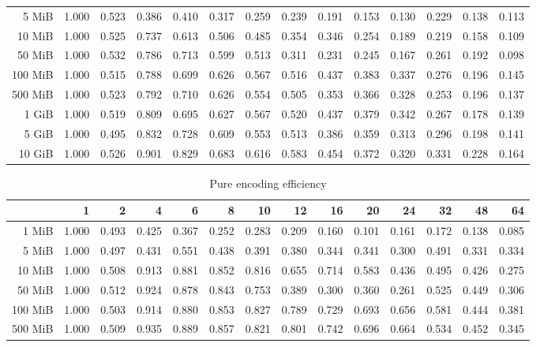 \begin{centering}
\begin{table}[!h]
\begin{tabular}{rrrrrrrrrrrrrr}
		5 MiB   & 1.000 & 0.523 & 0.386 & 0.410 & 0.317 & 0.259 & 0.239 & 0.191 & 0.153 & 0.130 & 0.229 & 0.138 & 0.113 \\
		10 MiB  & 1.000 & 0.525 & 0.737 & 0.613 & 0.506 & 0.485 & 0.354 & 0.346 & 0.254 & 0.189 & 0.219 & 0.158 & 0.109 \\
		50 MiB  & 1.000 & 0.532 & 0.786 & 0.713 & 0.599 & 0.513 & 0.311 & 0.231 & 0.245 & 0.167 & 0.261 & 0.192 & 0.098 \\
		100 MiB & 1.000 & 0.515 & 0.788 & 0.699 & 0.626 & 0.567 & 0.516 & 0.437 & 0.383 & 0.337 & 0.276 & 0.196 & 0.145 \\
		500 MiB & 1.000 & 0.523 & 0.792 & 0.710 & 0.626 & 0.554 & 0.505 & 0.353 & 0.366 & 0.328 & 0.253 & 0.196 & 0.137 \\
		1 GiB   & 1.000 & 0.519 & 0.809 & 0.695 & 0.627 & 0.567 & 0.520 & 0.437 & 0.379 & 0.342 & 0.267 & 0.178 & 0.139 \\
		5 GiB   & 1.000 & 0.495 & 0.832 & 0.728 & 0.609 & 0.553 & 0.513 & 0.386 & 0.359 & 0.313 & 0.296 & 0.198 & 0.141 \\
		10 GiB  & 1.000 & 0.526 & 0.901 & 0.829 & 0.683 & 0.616 & 0.583 & 0.454 & 0.372 & 0.320 & 0.331 & 0.228 & 0.164 \\
		\bottomrule
	\end{tabular}
\end{table}
\begin{table}[!h]
	\caption{Pure encoding efficiency}
	\begin{tabular}{rrrrrrrrrrrrrr}
		\toprule
		\diagbox[width=7em]{Size}{Threads} &    1  &    2  &    4  &    6  &    8  &    10 &    12 &    16 &    20 &    24 &    32 &    48 &    64 \\
		\midrule
		1 MiB   & 1.000 & 0.493 & 0.425 & 0.367 & 0.252 & 0.283 & 0.209 & 0.160 & 0.101 & 0.161 & 0.172 & 0.138 & 0.085 \\
		5 MiB   & 1.000 & 0.497 & 0.431 & 0.551 & 0.438 & 0.391 & 0.380 & 0.344 & 0.341 & 0.300 & 0.491 & 0.331 & 0.334 \\
		10 MiB  & 1.000 & 0.508 & 0.913 & 0.881 & 0.852 & 0.816 & 0.655 & 0.714 & 0.583 & 0.436 & 0.495 & 0.426 & 0.275 \\
		50 MiB  & 1.000 & 0.512 & 0.924 & 0.878 & 0.843 & 0.753 & 0.389 & 0.300 & 0.360 & 0.261 & 0.525 & 0.449 & 0.306 \\
		100 MiB & 1.000 & 0.503 & 0.914 & 0.880 & 0.853 & 0.827 & 0.789 & 0.729 & 0.693 & 0.656 & 0.581 & 0.444 & 0.381 \\
		500 MiB & 1.000 & 0.509 & 0.935 & 0.889 & 0.857 & 0.821 & 0.801 & 0.742 & 0.696 & 0.664 & 0.534 & 0.452 & 0.345 \\

\end{tabular}
\end{table}
\end{centering}
